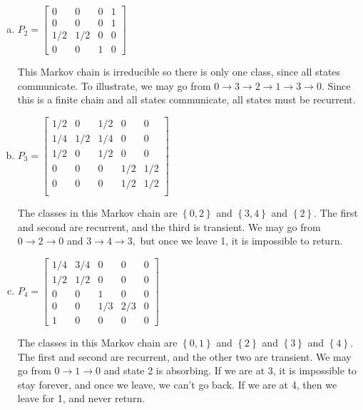 \documentclass{article}
\begin{document}
\begin{itemize}
\begin{enumerate}[(a)]
			\item $P_2=\begin{bmatrix}
					0 & 0 & 0 & 1 \\ 0 & 0 & 0 & 1 \\ 1/2 & 1/2 & 0 & 0 \\ 0 & 0 & 1 & 0
				\end{bmatrix}$
				\begin{soln}
					This Markov chain is irreducible so there is only one class, since all states communicate. To illustrate, we may go from $0\to3\to2\to1\to3\to0.$ Since this is a finite chain and all states communicate, all states must be recurrent.
				\end{soln}

			\item $P_3=\begin{bmatrix}
					1/2 & 0 & 1/2 & 0 & 0 \\
					1/4 & 1/2 & 1/4 & 0 & 0 \\
					1/2 & 0 & 1/2 & 0 & 0 \\
					0 & 0 & 0 & 1/2 & 1/2 \\
					0 & 0 & 0 & 1/2 & 1/2 \\
				\end{bmatrix}$
				\begin{soln}
					The classes in this Markov chain are $\left\{ 0, 2 \right\}$ and $\left\{ 3, 4 \right\}$ and $\left\{ 2 \right\}.$ The first and second are recurrent, and the third is transient. We may go from $0\to2\to0$ and $3\to4\to3,$ but once we leave 1, it is impossible to return. 
				\end{soln}

			\item $P_4=\begin{bmatrix}
					1/4 & 3/4 & 0 & 0 & 0 \\
					1/2 & 1/2 & 0 & 0 & 0 \\
					0 & 0 & 1 & 0 & 0 \\
					0 & 0 & 1/3 & 2/3 & 0 \\
					1 & 0 & 0 & 0 & 0
				\end{bmatrix}$
				\begin{soln}
					The classes in this Markov chain are $\left\{ 0, 1 \right\}$ and $\left\{ 2 \right\}$ and $\left\{ 3 \right\}$ and $\left\{ 4 \right\}.$ The first and second are recurrent, and the other two are transient. We may go from $0\to1\to 0$ and state 2 is absorbing. If we are at 3, it is impossible to stay forever, and once we leave, we can't go back. If we are at 4, then we leave for 1, and never return.
				\end{soln}
				

\end{enumerate}
\end{itemize}
\end{document}
